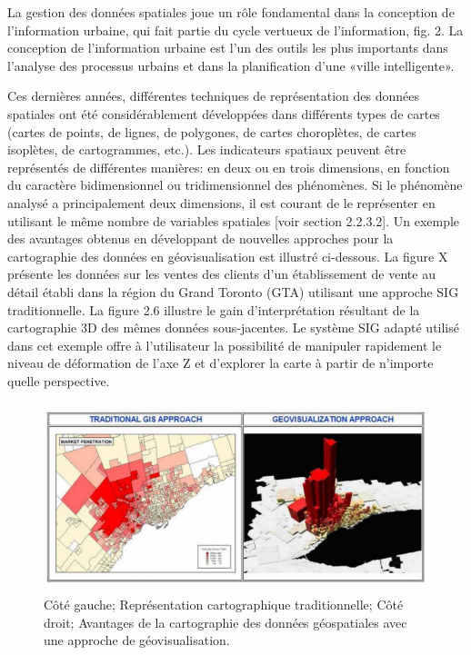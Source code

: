 \documentclass[french, a4paper, 12pt]{report}
\begin{document}
La gestion des données spatiales joue un rôle fondamental dans la conception de l’information urbaine, qui fait partie du cycle vertueux de l’information, fig. 2. La conception de l'information urbaine est l'un des outils les plus importants dans l'analyse des processus urbains et dans la planification d'une «ville intelligente».

Ces dernières années, différentes techniques de représentation des données spatiales ont été considérablement développées dans différents types de cartes (cartes de points, de lignes, de polygones, de cartes choroplètes, de cartes isoplètes, de cartogrammes, etc.). Les indicateurs spatiaux peuvent être représentés de différentes manières: en deux ou en trois dimensions, en fonction du caractère bidimensionnel ou tridimensionnel des phénomènes. Si le phénomène analysé a principalement deux dimensions, il est courant de le représenter en utilisant le même nombre de variables spatiales [voir section 2.2.3.2].
Un exemple des avantages obtenus en développant de nouvelles approches pour la cartographie des données en géovisualisation est illustré ci-dessous. La figure X présente les données sur les ventes des clients d'un établissement de vente au détail établi dans la région du Grand Toronto (GTA) utilisant une approche SIG traditionnelle. La figure 2.6 illustre le gain d'interprétation résultant de la cartographie 3D des mêmes données sous-jacentes. Le système SIG adapté utilisé dans cet exemple offre à l'utilisateur la possibilité de manipuler rapidement le niveau de déformation de l'axe Z et d'explorer la carte à partir de n'importe quelle perspective.
\begin{figure}[!ht]
    \centering
    \includegraphics[height=5.5cm]{images/geo1.jpg}
    \caption{Côté gauche; Représentation cartographique traditionnelle; Côté droit; Avantages de la cartographie des données géospatiales avec une approche de géovisualisation.}
    \label{fig:2.12}
\end{figure}
\end{document}
